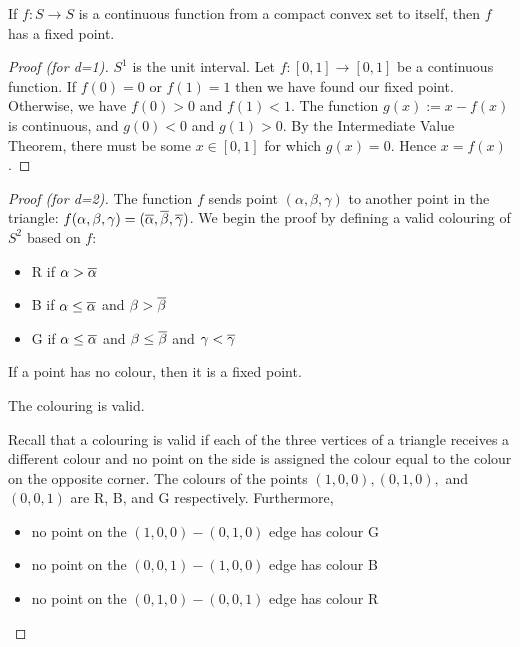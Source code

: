 \begin{theorem}
	If $f: S \rightarrow S$ is a continuous function from a compact convex set
	to itself, then $f$ has a fixed point.
\end{theorem}

\begin{proof}[Proof \emph{(for d=1)}]
	$S^1$ is the unit interval. Let $f:[0,1] \rightarrow [0,1]$ be a continuous
	function. If $f(0)=0$ or $f(1)=1$ then we have found our fixed point.
	Otherwise, we have $f(0)>0$ and $f(1)<1$. The function $g(x) := x - f(x)$
	is continuous, and $g(0)<0$ and $g(1)>0$. By the Intermediate Value
	Theorem, there must be some $x \in [0,1]$ for which $g(x) = 0$. Hence $x =
	f(x)$.
\end{proof}

\begin{proof}[Proof \emph{(for d=2)}]
	The function $f$ sends point $(\alpha, \beta, \gamma)$ to another point
	in the triangle: $f(\alpha, \beta, \gamma) = (\overline{\alpha},
	\overline{\beta}, \overline{\gamma})$. We begin the proof by defining a valid
	colouring of $S^2$ based on $f$:
	\begin{itemize}
		\item R if $\alpha > \overline{\alpha}$
		\item B if $\alpha \le \overline{\alpha}$ and $\beta > \overline{\beta}$
		\item G if $\alpha \le \overline{\alpha}$ and $\beta \le \overline{\beta}$
			and $\gamma < \overline{\gamma}$
	\end{itemize}

	\begin{fact}
		If a point has no colour, then it is a fixed point.
	\end{fact}

	\begin{claim*}
		The colouring is valid.
	\end{claim*}
	\begin{subproof}
		Recall that a colouring is valid if each of the three vertices of a
		triangle receives a different colour and no point on the side is
		assigned the colour equal to the colour on the opposite corner. The
		colours of the points $(1,0,0), (0,1,0),$ and $(0,0,1)$ are R, B,
		and G respectively. Furthermore,
		\begin{itemize}
			\item no point on the $(1,0,0)-(0,1,0)$ edge has colour G
			\item no point on the $(0,0,1)-(1,0,0)$ edge has colour B
			\item no point on the $(0,1,0)-(0,0,1)$ edge has colour R
		\end{itemize}
	\end{subproof}


\end{proof}
